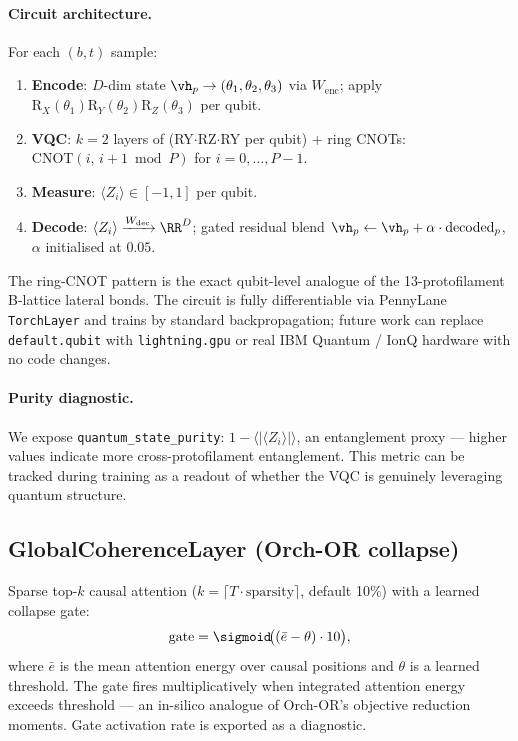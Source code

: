 \paragraph{Circuit architecture.}
For each $(b, t)$ sample:
\begin{enumerate}[noitemsep]
  \item \textbf{Encode}: $D$-dim state $\vh_p \to (\theta_1, \theta_2, \theta_3)$ via $W_\text{enc}$; apply $\mathrm{R}_X(\theta_1)\mathrm{R}_Y(\theta_2)\mathrm{R}_Z(\theta_3)$ per qubit.
  \item \textbf{VQC}: $k=2$ layers of (RY$\cdot$RZ$\cdot$RY per qubit) + ring CNOTs: $\mathrm{CNOT}(i,\,i+1\bmod P)$ for $i=0,\ldots,P-1$.
  \item \textbf{Measure}: $\langle Z_i\rangle\in[-1,1]$ per qubit.
  \item \textbf{Decode}: $\langle Z_i\rangle \xrightarrow{W_\text{dec}} \RR^D$; gated residual blend $\vh_p \leftarrow \vh_p + \alpha\cdot\text{decoded}_p$, $\alpha$ initialised at $0.05$.
\end{enumerate}
The ring-CNOT pattern is the exact qubit-level analogue of the 13-protofilament B-lattice lateral bonds. The circuit is fully differentiable via PennyLane \texttt{TorchLayer} \citep{bergholm2018pennylane} and trains by standard backpropagation; future work can replace \texttt{default.qubit} with \texttt{lightning.gpu} or real IBM Quantum / IonQ hardware with no code changes.

\paragraph{Purity diagnostic.}
We expose \texttt{quantum\_state\_purity}: $1 - \langle|\langle Z_i\rangle|\rangle$, an entanglement proxy — higher values indicate more cross-protofilament entanglement. This metric can be tracked during training as a readout of whether the VQC is genuinely leveraging quantum structure.

\subsection{GlobalCoherenceLayer (Orch-OR collapse)}
\label{sec:coherence}

Sparse top-$k$ causal attention ($k=\lceil T\cdot\text{sparsity}\rceil$, default 10\%) with a learned collapse gate:
\begin{equation}
  \text{gate} = \sigmoid\!\bigl((\bar{e}-\theta)\cdot 10\bigr),
\end{equation}
where $\bar{e}$ is the mean attention energy over causal positions and $\theta$ is a learned threshold. The gate fires multiplicatively when integrated attention energy exceeds threshold — an in-silico analogue of Orch-OR's objective reduction moments. Gate activation rate is exported as a diagnostic.

